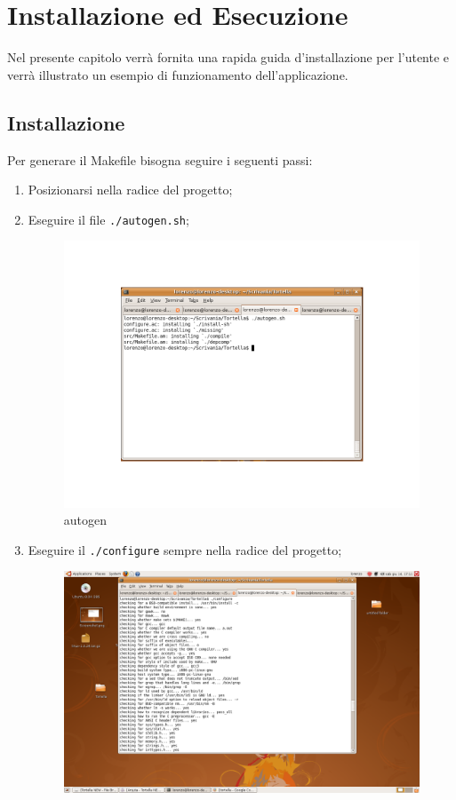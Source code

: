 \chapter{Installazione ed Esecuzione}
Nel presente capitolo verrà fornita una rapida guida d'installazione per l'utente e verrà illustrato un esempio di funzionamento dell'applicazione.
\section{Installazione}
Per generare il Makefile bisogna seguire i seguenti passi: 
\begin{enumerate}
\item Posizionarsi nella radice del progetto; 
\item Eseguire il file \lstinline{./autogen.sh};
\begin{figure}[H]
\begin{center}
\includegraphics[scale=0.5]{etc/autogen}
\caption{autogen}
\label{autogen}
\end{center}
\end{figure}
\item Eseguire il \lstinline{./configure} sempre nella radice del progetto;
\begin{figure}[H]
\begin{center}
\includegraphics[scale=0.5]{etc/configure}

\end{center}
\end{figure}
\end{enumerate}
